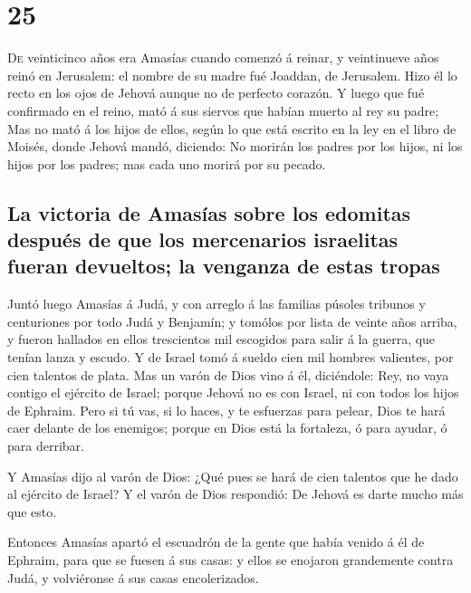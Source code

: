 \hypertarget{section-14-25}{%
\section{25}\label{section-14-25}}

 \textsc{De} veinticinco años era Amasías cuando comenzó á
reinar, y veintinueve años reinó en Jerusalem: el nombre de su madre fué
Joaddan, de Jerusalem.  Hizo él lo recto en los ojos de
Jehová aunque no de perfecto corazón.  Y luego que fué
confirmado en el reino, mató á sus siervos que habían muerto al rey su
padre;  Mas no mató á los hijos de ellos, según lo que
está escrito en la ley en el libro de Moisés, donde Jehová mandó,
diciendo: No morirán los padres por los hijos, ni los hijos por los
padres; mas cada uno morirá por su pecado.

\hypertarget{la-victoria-de-amasuxedas-sobre-los-edomitas-despuuxe9s-de-que-los-mercenarios-israelitas-fueran-devueltos-la-venganza-de-estas-tropas}{%
\subsection{La victoria de Amasías sobre los edomitas después de que los
mercenarios israelitas fueran devueltos; la venganza de estas
tropas}\label{la-victoria-de-amasuxedas-sobre-los-edomitas-despuuxe9s-de-que-los-mercenarios-israelitas-fueran-devueltos-la-venganza-de-estas-tropas}}

 Juntó luego Amasías á Judá, y con arreglo á las familias
púsoles tribunos y centuriones por todo Judá y Benjamín; y tomólos por
lista de veinte años arriba, y fueron hallados en ellos trescientos mil
escogidos para salir á la guerra, que tenían lanza y escudo.
 Y de Israel tomó á sueldo cien mil hombres valientes, por
cien talentos de plata.  Mas un varón de Dios vino á él,
diciéndole: Rey, no vaya contigo el ejército de Israel; porque Jehová no
es con Israel, ni con todos los hijos de Ephraim.  Pero si
tú vas, si lo haces, y te esfuerzas para pelear, Dios te hará caer
delante de los enemigos; porque en Dios está la fortaleza, ó para
ayudar, ó para derribar.

 Y Amasías dijo al varón de Dios: ¿Qué pues se hará de
cien talentos que he dado al ejército de Israel? Y el varón de Dios
respondió: De Jehová es darte mucho más que esto.

 Entonces Amasías apartó el escuadrón de la gente que
había venido á él de Ephraim, para que se fuesen á sus casas: y ellos se
enojaron grandemente contra Judá, y volviéronse á sus casas
encolerizados.


